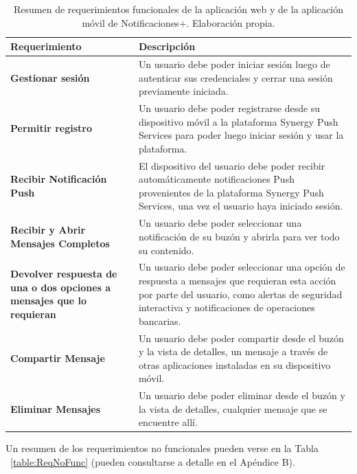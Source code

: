 \begin{table}[H]
\begin{tabular}{| p{6cm} | p{10cm} |}
\hline 
\bfseries \footnotesize {Requerimiento} & \bfseries \footnotesize {Descripción} \\ 
\hline 
\bfseries 
  \footnotesize {Gestionar sesión} &
  \footnotesize Un usuario debe poder iniciar sesión luego de autenticar sus credenciales y cerrar una sesión previamente iniciada. \\ \hline 
\bfseries 
  \footnotesize {Permitir registro} & 
  \footnotesize Un usuario debe poder registrarse desde su dispositivo móvil a la plataforma Synergy Push Services para poder luego iniciar sesión y usar la plataforma. \\ \hline 
\bfseries 
  \footnotesize {Recibir Notificación Push} & 
  \footnotesize El dispositivo del usuario debe poder recibir automáticamente notificaciones Push provenientes de la plataforma Synergy Push Services, una vez el usuario haya iniciado sesión. \\ \hline 
\bfseries \footnotesize {Recibir y Abrir Mensajes Completos} & \footnotesize Un usuario debe poder seleccionar una notificación de su buzón y abrirla para ver todo su contenido. \\ \hline 
\bfseries 
  \footnotesize {Devolver respuesta de una o dos opciones a mensajes que lo requieran} & 
  \footnotesize Un usuario debe poder seleccionar una opción de respuesta a mensajes que requieran esta acción por parte del usuario, como alertas de seguridad interactiva y notificaciones de operaciones bancarias. \\ \hline 
\bfseries 
  \footnotesize {Compartir Mensaje} & 
  \footnotesize Un usuario debe poder compartir desde el buzón y la vista de detalles, un mensaje a través de otras aplicaciones instaladas en su dispositivo móvil. \\ \hline 
\bfseries 
  \footnotesize {Eliminar Mensajes} & 
  \footnotesize Un usuario debe poder eliminar desde el buzón y la vista de detalles, cualquier mensaje que se encuentre allí. \\ \hline 
\end{tabular}
\footnotesize \caption{Resumen de requerimientos funcionales de la aplicación web y de la aplicación móvil de Notificaciones+. Elaboración propia.}
\label{table:ReqFunc}
\end{table}

Un resumen de los requerimientos no funcionales pueden verse en la Tabla ~\ref{table:ReqNoFunc} (pueden consultarse a detalle en el Apéndice B).

